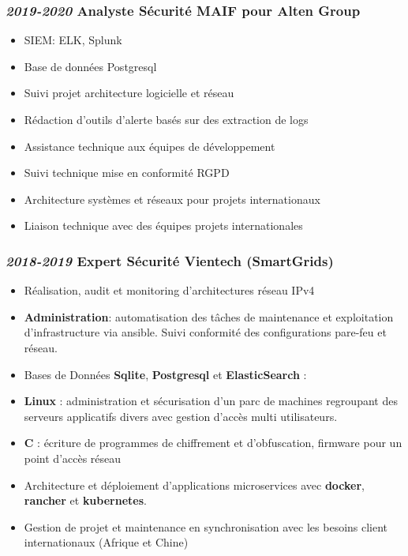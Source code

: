 \documentclass[a4paper, oneside, final]{scrartcl} %
\begin{document}
\begin{center}
\subsubsection*{\textit{\textbf{2019-2020}} Analyste Sécurité MAIF pour Alten Group}
\begin{itemize}
\item SIEM: ELK, Splunk
\item Base de données Postgresql
\item Suivi projet architecture logicielle et réseau
\item Rédaction d'outils d'alerte basés sur des extraction de logs
\item Assistance technique aux équipes de développement 
\item Suivi technique mise en conformité RGPD
\item Architecture systèmes et réseaux pour projets internationaux
\item Liaison technique avec des équipes projets internationales
\end{itemize}


\subsubsection*{\textit{\textbf{2018-2019}} Expert Sécurité Vientech (SmartGrids)}
\begin{itemize}
\item Réalisation, audit et monitoring d'architectures réseau IPv4
\item \textbf{Administration}: automatisation des tâches de maintenance et exploitation d'infrastructure via ansible. Suivi conformité des configurations pare-feu et réseau.
\item Bases de Données \textbf{Sqlite}, \textbf{Postgresql} et \textbf{ElasticSearch} :
\item  \textbf{Linux} : administration et sécurisation d'un parc de machines regroupant des serveurs applicatifs divers avec gestion d'accès multi utilisateurs.
\item \textbf{C} : écriture de programmes de chiffrement et d'obfuscation, firmware pour un point d'accès réseau
\item Architecture et déploiement d'applications microservices avec
    \textbf{docker},
    \textbf{rancher} et \textbf{kubernetes}.
\item Gestion de projet et maintenance en synchronisation avec les besoins client internationaux (Afrique et Chine)
\end{itemize}


\end{center}
\end{document}
